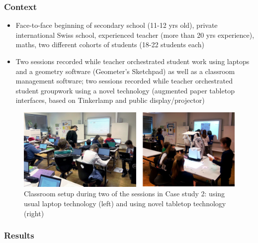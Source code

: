 \documentclass[10pt,journal,compsoc]{IEEEtran}
\begin{document}
\subsubsection{Context}

\begin{itemize}
\item Face-to-face beginning of secondary school (11-12 yrs old), private international Swiss school, experienced teacher (more than 20 yrs experience), maths, two different cohorts of students (18-22 students each) %
\item Two sessions recorded while teacher orchestrated student work using laptops and a geometry software (Geometer's Sketchpad) as well as a classroom management software; two sessions recorded while teacher orchestrated student groupwork using a novel technology (augmented paper tabletop interfaces, based on Tinkerlamp \cite{do2012tinkerlamp} and public display/projector)
\end{itemize}

\begin{figure}[!t]
\centering
\includegraphics[width=\linewidth]{img/Case2Picture}
\caption{Classroom setup during two of the sessions in Case study 2: using usual laptop technology (left) and using novel tabletop technology (right)}
\label{fig:case1picture}
\end{figure}

\subsubsection{Results}
\end{document}
